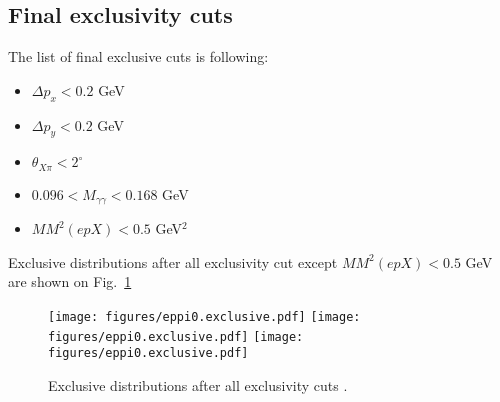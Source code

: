 \subsection{Final exclusivity cuts}

The list of final exclusive cuts is following:
\begin{itemize}
	\item $\Delta p_x<0.2$ GeV
	\item $\Delta p_y<0.2$ GeV
	\item $\theta_{X\pi}<2^\circ$
	\item $0.096<M_{\gamma\gamma}<0.168$ GeV
	\item $MM^2(epX)<0.5$ GeV$^2$
\end{itemize}

Exclusive distributions after all exclusivity cut except $MM^2(epX)<0.5$ GeV are shown on Fig.~\ref{fig:finalexclusive}

\begin{figure}[hbt]
	\centering
	
	\texttt{[image: figures/eppi0.exclusive.pdf]}
	\texttt{[image: figures/eppi0.exclusive.pdf]}
	\texttt{[image: figures/eppi0.exclusive.pdf]}
	\caption{Exclusive distributions after all exclusivity cuts .}
	\label{fig:finalexclusive}
\end{figure}

